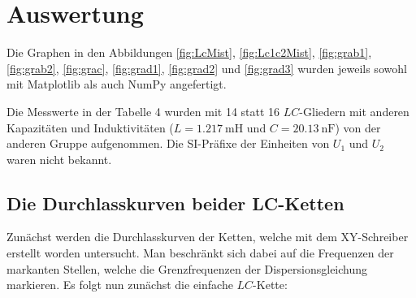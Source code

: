 
\section{Auswertung}
\label{sec:Auswertung}
Die Graphen in den Abbildungen \ref{fig:LcMist}, \ref{fig:Lc1c2Mist}, \ref{fig:grab1},
 \ref{fig:grab2}, \ref{fig:grac}, \ref{fig:grad1}, \ref{fig:grad2} und \ref{fig:grad3}
  wurden jeweils sowohl mit Matplotlib \cite{matplotlib} als auch NumPy \cite{numpy} angefertigt.
	
Die Messwerte in der Tabelle 4 wurden mit 14 statt 16 $LC$-Gliedern mit anderen
 Kapazitäten und Induktivitäten ($L = \SI{1.217}{\milli\henry}$ und $C = \SI{20.13}{\nano\farad}$) von der anderen Gruppe aufgenommen.
Die SI-Präfixe der Einheiten von $U_1$ und $U_2$ waren nicht bekannt.


\subsection{Die Durchlasskurven beider LC-Ketten}
Zunächst werden die Durchlasskurven der Ketten, welche mit dem XY-Schreiber
 erstellt worden untersucht. Man beschränkt sich dabei auf die Frequenzen der
  markanten Stellen, welche die Grenzfrequenzen der Dispersionsgleichung
	 markieren. Es folgt nun zunächst die einfache $LC$-Kette:


